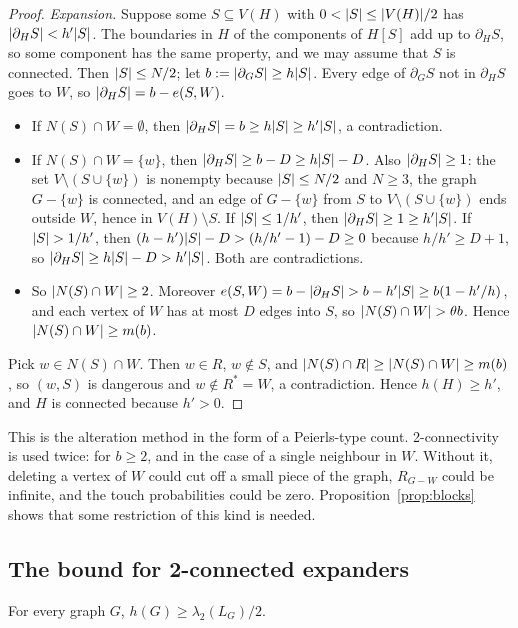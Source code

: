 \begin{proof}
\emph{Expansion.} Suppose some $S\subseteq V(H)$ with $0<\lvert S\rvert\le\lvert V(H)\rvert/2$ has $\lvert \partial_HS\rvert<h'\lvert S\rvert$. The boundaries in $H$ of the components of $H[S]$ add up to $\partial_HS$, so some component has the same property, and we may assume that $S$ is connected. Then $\lvert S\rvert\le N/2$; let $b:=\lvert \partial_GS\rvert\ge h\lvert S\rvert$. Every edge of $\partial_GS$ not in $\partial_HS$ goes to $W$, so $\lvert \partial_HS\rvert=b-e(S,W)$.
\begin{itemize}
\item If $N(S)\cap W=\emptyset$, then $\lvert \partial_HS\rvert=b\ge h\lvert S\rvert\ge h'\lvert S\rvert$, a contradiction.
\item If $N(S)\cap W=\{w\}$, then $\lvert \partial_HS\rvert\ge b-D\ge h\lvert S\rvert-D$. Also $\lvert \partial_HS\rvert\ge1$: the set $V\setminus(S\cup\{w\})$ is nonempty because $\lvert S\rvert\le N/2$ and $N\ge3$, the graph $G-\{w\}$ is connected, and an edge of $G-\{w\}$ from $S$ to $V\setminus(S\cup\{w\})$ ends outside $W$, hence in $V(H)\setminus S$. If $\lvert S\rvert\le1/h'$, then $\lvert \partial_HS\rvert\ge1\ge h'\lvert S\rvert$. If $\lvert S\rvert>1/h'$, then $(h-h')\lvert S\rvert-D>(h/h'-1)-D\ge0$ because $h/h'\ge D+1$, so $\lvert \partial_HS\rvert\ge h\lvert S\rvert-D>h'\lvert S\rvert$. Both are contradictions.
\item So $\lvert N(S)\cap W\rvert\ge2$. Moreover $e(S,W)=b-\lvert \partial_HS\rvert>b-h'\lvert S\rvert\ge b(1-h'/h)$, and each vertex of $W$ has at most $D$ edges into $S$, so $\lvert N(S)\cap W\rvert>\theta b$. Hence $\lvert N(S)\cap W\rvert\ge m(b)$.
\end{itemize}
Pick $w\in N(S)\cap W$. Then $w\in R$, $w\notin S$, and $\lvert N(S)\cap R\rvert\ge\lvert N(S)\cap W\rvert\ge m(b)$, so $(w,S)$ is dangerous and $w\notin R^*=W$, a contradiction. Hence $h(H)\ge h'$, and $H$ is connected because $h'>0$.
\end{proof}

This is the alteration method in the form of a Peierls-type count. 2-connectivity is used twice: for $b\ge2$, and in the case of a single neighbour in $W$. Without it, deleting a vertex of $W$ could cut off a small piece of the graph, $R_{G-W}$ could be infinite, and the touch probabilities could be zero. Proposition~\ref{prop:blocks} shows that some restriction of this kind is needed.

\subsection{The bound for 2-connected expanders}

\begin{lemma}\label{lem:easy-cheeger}
For every graph $G$, $h(G)\ge\lambda_2(L_G)/2$.
\end{lemma}

